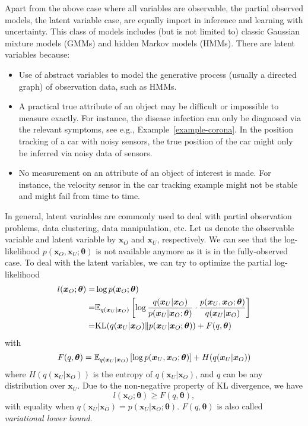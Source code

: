 Apart from the above case where all variables are observable, the partial observed models, the latent variable case, are equally import in inference and learning with uncertainty. This class of models includes (but is not limited to) classic Gaussian mixture models (GMMs) and hidden Markov models (HMMs). There are latent variables because:
\begin{itemize}
\item Use of abstract variables to model the generative process (usually a directed graph) of observation data, such as HMMs.
\item A practical true attribute of an object may be difficult or impossible to measure exactly. For instance, the disease infection can only be diagnosed via the relevant symptoms, see e.g., Example~\ref{example-corona}. In the position tracking of a car with noisy sensors, the true position of the car might only be inferred via noisy data of sensors.
\item No measurement on an attribute of an object of interest is made. For instance, the velocity sensor in the car tracking example might not be stable and might fail from time to time.
\end{itemize}
In general, latent variables are commonly used to deal with partial observation problems, data clustering, data manipulation, etc. Let us denote the observable variable and latent variable by $\bm{x}_O$ and $\bm{x}_U$, respectively. We can see that the log-likelihood $p(\bm{x}_O, \bm{x}_U; \bm{\theta})$ is not available anymore as it is in the fully-observed case. To deal with the latent variables, we can try to optimize the partial log-likelihood
\begin{align}
  l(\bm{x}_O; \bm{\theta}) =& \log{p(\bm{x}_O; \bm{\theta})} \nonumber \\  
  = & \mathbb{E}_{q(\bm{x}_U|\bm{x}_O)}\left[ \log{\frac{q(\bm{x}_U|\bm{x}_O)}{p(\bm{x}_U|\bm{x}_O;\bm{\theta})} \cdot \frac{p(\bm{x}_U,\bm{x}_O;\bm{\theta})}{q(\bm{x}_U|\bm{x}_O)}} \right] \nonumber \\
  = & \mathrm{KL}(q(\bm{x}_U|\bm{x}_O)\|p(\bm{x}_U|\bm{x}_O;\bm{\theta})) + F(q, \bm{\theta})
\end{align}
with
\begin{equation}\label{chpt2:eq:llk-lower-bound}
  F(q, \bm{\theta}) = \mathbb{E}_{q(\bm{x}_U|\bm{x}_O)}\left[ \log{p(\bm{x}_U,\bm{x}_O;\bm{\theta})} \right] + H(q(\bm{x}_U|\bm{x}_O))
\end{equation}
where $H(q(\bm{x}_U|\bm{x}_O))$ is the entropy of $q(\bm{x}_U|\bm{x}_O)$, and $q$ can be any distribution over $\bm{x}_U$. Due to the non-negative property of KL divergence, we have
\begin{equation}
  l(\bm{x}_O; \bm{\theta}) \geq F(q, \bm{\theta}),
\end{equation}
with equality when $q(\bm{x}_U|\bm{x}_O) = p(\bm{x}_U|\bm{x}_O; \bm{\theta})$. $F(q, \bm{\theta})$ is also called \textit{variational lower bound}.

